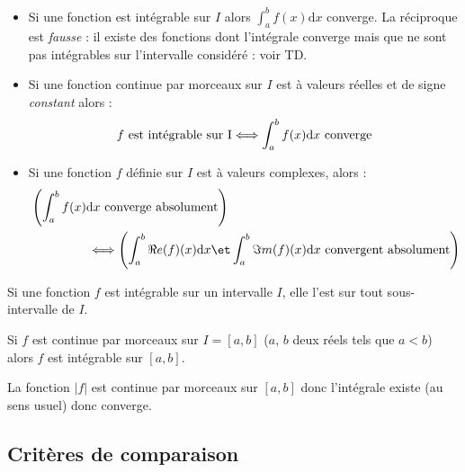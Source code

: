 \documentclass[french,11pt,twoside]{VcCours}
\newcommand{\dx}{\text{d}x}
\begin{document}
\begin{Remarques}{}
\begin{itemize}
\item Si une fonction est intégrable sur $I$ alors $\int_{a}^b f(x) \dx$ converge. La réciproque est \emph{fausse} : il existe des fonctions dont l'intégrale converge mais que ne sont pas intégrables sur l'intervalle considéré : voir TD.
\item Si une fonction continue par morceaux sur $I$ est à valeurs réelles et de signe \emph{constant} alors :
$$ f \hbox{ est intégrable sur I} \Longleftrightarrow \int_{a}^b f(x) \dx \hbox{ converge}$$
\item Si une fonction $f$ définie sur $I$ est à valeurs complexes, alors :
\begin{align*}
	&\left(\int_{a}^b f(x) \dx \text{ converge absolument}\right)\\
	&\phantom{\int_{a}^b f(x) \dx}\Longleftrightarrow \left(\int_{a}^b \Re e(f)(x) \dx \et  
	\int_{a}^b \Im m(f)(x) \dx \text{ convergent absolument}\right)
\end{align*}
\end{itemize}
\end{Remarques}

\begin{Proposition}{} Si une fonction $f$ est intégrable sur un intervalle $I$, elle l'est sur tout sous-intervalle de $I$.
\end{Proposition}

\begin{Proposition}{} Si $f$ est continue par morceaux sur $I=[a,b]$ ($a$, $b$ deux réels tels que $a <b$)  alors $f$ est intégrable sur $[a,b]$.
\end{Proposition}

\begin{Demonstration}{}
La fonction $\vert f \vert$ est continue par morceaux sur $[a,b]$ donc l'intégrale existe (au sens usuel) donc converge.
\end{Demonstration}

\newpage
\subsection{Critères de comparaison}
\end{document}
